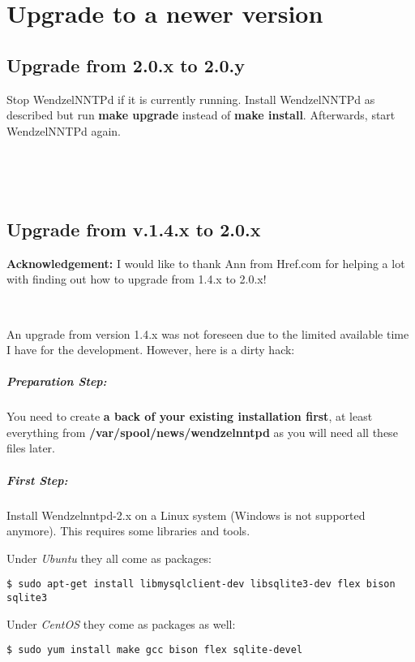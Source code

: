 \chapter{Upgrade to a newer version}\label{Ch:Upgrade}

\section{Upgrade from 2.0.x to 2.0.y}

Stop WendzelNNTPd if it is currently running. Install WendzelNNTPd as described but run {\bf make upgrade} instead of {\bf make install}. Afterwards, start WendzelNNTPd again.

~

~

\section{Upgrade from v.1.4.x to 2.0.x}

{\bf Acknowledgement:} I would like to thank Ann from Href.com for helping a lot with finding out how to upgrade from 1.4.x to 2.0.x!

~

An upgrade from version 1.4.x was not foreseen due to the limited available time I have for the development. However, here is a dirty hack:

\paragraph*{Preparation Step:} You need to create \textbf{a back of your existing installation first}, at least everything from \textbf{/var/spool/news/wendzelnntpd} as you will need all these files later.

\paragraph*{First Step:} Install Wendzelnntpd-2.x on a Linux system (Windows is not supported anymore). This requires some libraries and tools.

Under {\it Ubuntu} they all come as packages:
\begin{verbatim}
$ sudo apt-get install libmysqlclient-dev libsqlite3-dev flex bison sqlite3
\end{verbatim}

Under {\it CentOS} they come as packages as well:
\begin{verbatim}
$ sudo yum install make gcc bison flex sqlite-devel
\end{verbatim}

